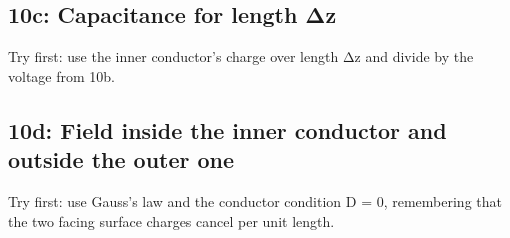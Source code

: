\documentclass[11pt]{article}
\begin{document}
\begin{keepsection}
\begin{keepsection}
\end{keepsection}

\begin{keepsection}
\subsection{10c: Capacitance for length Δz}

Try first: use the inner conductor’s charge over length Δz and divide by the voltage from 10b.

\end{keepsection}

\begin{keepsection}
\subsection{10d: Field inside the inner conductor and outside the outer one}

Try first: use Gauss’s law and the conductor condition D = 0, remembering that the two facing surface charges cancel per unit length.

\end{keepsection}
\end{keepsection}


\clearpage
\end{document}
